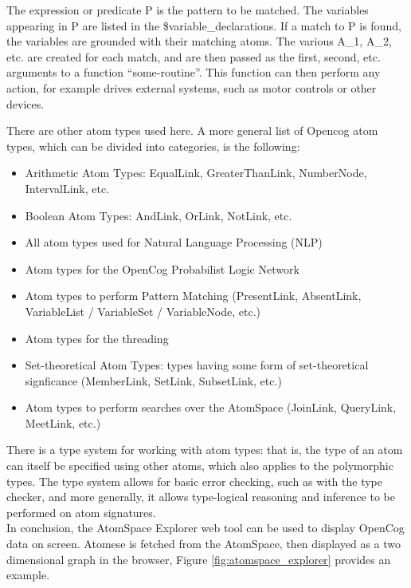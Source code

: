 \begin{itemize}
The expression or predicate P is the pattern to be matched. The variables appearing in P are listed in the \$variable\_declarations. If a match to P is found, the variables are grounded with their matching atoms. The various A\_1, A\_2, etc. are created for each match, and are then passed as the first, second, etc. arguments to a function \enquote{some-routine}. This function can then perform any action, for example drives external systems, such as motor controls or other devices.
\end{itemize}

There are other atom types used here. A more general list of Opencog atom types, which can be divided into categories, is the following:

\begin{itemize}
\item Arithmetic Atom Types: EqualLink, GreaterThanLink, NumberNode, IntervalLink, etc.
\item Boolean Atom Types: AndLink, OrLink, NotLink, etc. 
\item All atom types used for Natural Language Processing (NLP)
\item Atom types for the OpenCog Probabilist Logic Network
\item Atom types to perform Pattern Matching (PresentLink, AbsentLink, VariableList / VariableSet / VariableNode, etc.) 
\item Atom types for the threading 
\item Set-theoretical Atom Types: types having some form of set-theoretical signficance (MemberLink, SetLink, SubsetLink, etc.)
\item Atom types to perform searches over the AtomSpace (JoinLink, QueryLink, MeetLink, etc.) 
\end{itemize}

There is a type system for working with atom types: that is, the type of an atom can itself be specified using other atoms, which also applies to the polymorphic types. The type system allows for basic error checking, such as with the type checker, and more generally, it allows type-logical reasoning and inference to be performed on atom signatures. \\

In conclusion, the AtomSpace Explorer web tool can be used to display OpenCog data on screen. Atomese is fetched from the AtomSpace, then displayed as a two dimensional graph in the browser, Figure \ref{fig:atomspace_explorer} provides an example. \\

